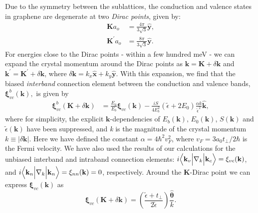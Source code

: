 \documentclass[twocolumn,secnumarabic,amssymb, nobibnotes, aps, prd, superscriptaddress]{revtex4-1}
\begin{document}
Due to the symmetry between the sublattices, the conduction and valence states in graphene are degenerate at two \textit{Dirac points}, given by: \begin{equation}\begin{aligned}\mathbf{K}a_{o} & =\frac{4\pi}{3\sqrt{3}}\widehat{\mathbf{y}},\\
\mathbf{K}^{\prime}a_{o} & =\frac{8\pi}{3\sqrt{3}}\widehat{\mathbf{y}}.
\end{aligned}\end{equation}
For energies close to the Dirac points - within a few hundred meV - we can expand the crystal momentum around the Dirac points as $\mathbf{k}=\mathbf{K}+\delta\mathbf{k}$ and $\mathbf{k}^{\prime}=\mathbf{K}^{\prime}+\delta\mathbf{k}$, where $\delta\mathbf{k}=k_{x}\hat{\mathbf{x}}+k_{y}\hat{\mathbf{y}}$. With this expansion, we find that the biased \textit{interband} connection element between the conduction and valence bands, $\mathbf{\xi}_{vc}^{b}(\mathbf{k}),$ is given by
\begin{equation}
\begin{aligned}\mathbf{\xi}_{vc}^{b}\left(\mathbf{K}+\delta\mathbf{k}\right) & =\frac{E_{0}}{E_{b}}\mathbf{\xi}_{vc}(\mathbf{k})-\frac{iS}{4E_{b}^{2}}\left(\tilde{\epsilon}+2E_{0}\right)\frac{\alpha k}{\tilde{\epsilon}^2}\hat{\mathbf{k}},\end{aligned}\label{eq:connec}
\end{equation}
where for simplicity, the explicit $\mathbf{k}$-dependencies of $E_{b}(\mathbf{k}),\,E_{0}(\mathbf{k})$, $S(\mathbf{k})$ and $\tilde{\epsilon}(\mathbf{k})$ have been suppressed, and \textit{k} is the magnitude of the crystal momentum $k\equiv|\delta\mathbf{k}|$. Here we have defined the constant $\alpha=4\hbar^{2}v_{F}^2$, where $v_{F}=3a_{0}t_{\perp}/2\hbar$ is the Fermi velocity. We have also used the results of our calculations for the unbiased interband and intraband connection elements: $i\Bigl\langle\mathbf{k}_{v}\Bigr|\nabla_{k}\Bigl|\mathbf{k}_{c}\Bigr\rangle=\mathbf{\xi}_{vc}(\mathbf{k})$, and $i\Bigl\langle\mathbf{k}_{n}\Bigr|\nabla_{k}\Bigl|\mathbf{k}_{n}\Bigr\rangle=\mathbf{\xi}_{nn}(\mathbf{k})=0$, respectively\cite{mcgouran2016nonlinear}. Around the $\mathbf{K}$-Dirac point we can express $\mathbf{\xi}_{vc}(\mathbf{k})$ as
\begin{equation}
\mathbf{\xi}_{vc}\left(\mathbf{K}+\delta\mathbf{k}\right)=\left(\frac{\tilde{\epsilon}+t_{\perp}}{2\tilde{\epsilon}}\right)\frac{\widehat{\mathbf{\theta}}}{k}.
\end{equation}
\end{document}
